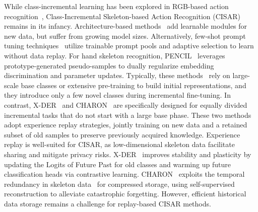 \documentclass[journal]{IEEEtran}
\begin{document}
While class-incremental learning has been explored in RGB-based action recognition~\cite{wu2019,Villa2023,ma2021}, Class-Incremental Skeleton-based Action Recognition (CISAR) remains in its infancy.
Architecture-based methods~\cite{li2021else,zhu2026} add learnable modules for new data, but suffer from growing model sizes.
Alternatively, few-shot prompt tuning techniques~\cite{garg2024,cheng2026} utilize trainable prompt pools and adaptive selection to learn without data replay.
For hand skeleton recognition, PENCIL~\cite{li2025pencil} leverages prototype-generated pseudo-samples to dually regularize embedding discrimination and parameter updates.
Typically, these methods~\cite{garg2024,cheng2026,li2025pencil} rely on large-scale base classes or extensive pre-training to build initial representations, and they introduce only a few novel classes during incremental fine-tuning.
In contrast, X-DER~\cite{boschini2023} and CHARON~\cite{mosconi2024} are specifically designed for equally divided incremental tasks that do not start with a large base phase.
These two methods adopt experience replay strategies, jointly training on new data and a retained subset of old samples to preserve previously acquired knowledge.
Experience replay is well-suited for CISAR, as low-dimensional skeleton data facilitate sharing and mitigate privacy risks.
X-DER~\cite{boschini2023} improves stability and plasticity by updating the Logits of Future Past for old classes and warming up future classification heads via contrastive learning.
CHARON~\cite{mosconi2024} exploits the temporal redundancy in skeleton data~\cite{kong2022} for compressed storage, using self-supervised reconstruction to alleviate catastrophic forgetting.
However, efficient historical data storage remains a challenge for replay-based CISAR methods.
\end{document}
